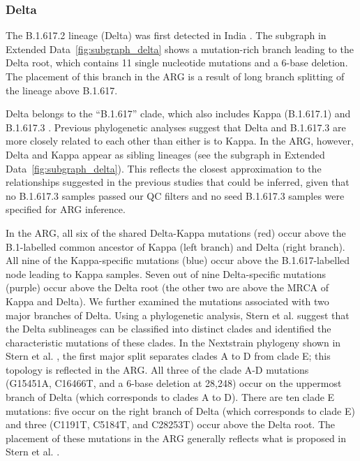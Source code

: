 \documentclass[12pt]{article}
\newcommand{\edref}[1]{Extended Data~\ref{#1}}
\begin{document}
\subsubsection{Delta}
\label{sec:dd_delta}

The B.1.617.2 lineage (Delta) was first detected in India \cite{ECDCreport}.
The subgraph in \edref{fig:subgraph_delta} shows
a mutation-rich branch leading to the Delta root,
which contains 11 single nucleotide mutations and a 6-base deletion.
The placement of this branch in the ARG
is a result of long branch splitting of the lineage above B.1.617.

Delta belongs to the ``B.1.617'' clade,
which also includes Kappa (B.1.617.1) and B.1.617.3 \cite{ECDCreport}.
Previous phylogenetic analyses suggest that
Delta and B.1.617.3 are more closely related to each other
than either is to Kappa\cite{Cherian2021,Farinholt2021}.
In the ARG, however, Delta and Kappa appear as sibling lineages
(see the subgraph in \edref{fig:subgraph_delta}).
This reflects the closest approximation to the relationships
suggested in the previous studies that could be inferred,
given that no B.1.617.3 samples passed our QC filters and
no seed B.1.617.3 samples were specified for ARG inference.

In the ARG, all six of the shared Delta-Kappa mutations (red)
occur above the B.1-labelled common ancestor
of Kappa (left branch) and Delta (right branch).
All nine of the Kappa-specific mutations (blue)
occur above the B.1.617-labelled node leading to Kappa samples.
Seven out of nine Delta-specific mutations (purple)
occur above the Delta root
(the other two are above the MRCA of Kappa and Delta).
We further examined the mutations associated with two major branches of Delta.
Using a phylogenetic analysis, Stern et al.\cite{Stern2021} suggest that
the Delta sublineages can be classified into distinct clades and
identified the characteristic mutations of these clades.
In the Nextstrain phylogeny shown in Stern et al. \cite{Stern2021},
the first major split separates clades A to D from clade E;
this topology is reflected in the ARG.
All three of the clade A-D mutations
(G15451A, C16466T, and a 6-base deletion at 28,248)
occur on the uppermost branch of Delta (which corresponds to clades A to D).
There are ten clade E mutations:
five occur on the right branch of Delta (which corresponds to clade E) and
three (C1191T, C5184T, and C28253T) occur above the Delta root.
The placement of these mutations in the ARG generally reflects
what is proposed in Stern et al. \cite{Stern2021}.
\end{document}

